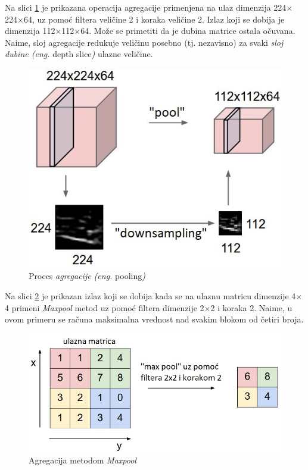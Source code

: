 \documentclass[a4paper]{article}
\begin{document}
Na slici \ref{fig:pool} je prikazana operacija agregacije primenjena na ulaz dimenzija 224$\times$224$\times$64, uz pomoć filtera veličine 2 i koraka veličine 2. Izlaz koji se dobija je dimenzija 112$\times$112$\times$64. Može se primetiti da je dubina matrice ostala očuvana. Naime, sloj agregacije redukuje veličinu posebno (tj. nezavisno) za svaki \textit{sloj dubine (eng.} depth slice\textit{)} ulazne veličine.

\begin{figure}[h!]
\begin{center}
\includegraphics[scale=0.4]{pool.jpeg}
\end{center}
\caption{Proces \textit{agregacije (eng.} pooling\textit{)}}
\label{fig:pool}
\end{figure}

Na slici \ref{fig:maxpool} je prikazan izlaz koji se dobija kada se na ulaznu matricu dimenzije 4$\times$4 primeni \textit{Maxpool} metod uz pomoć filtera dimenzije 2$\times$2 i koraka 2. Naime, u ovom primeru se računa maksimalna vrednost nad svakim blokom od četiri broja.
 
\begin{figure}[h!]
\begin{center}
\includegraphics[scale=0.4]{maxpool.jpeg}
\end{center}
\caption{Agregacija metodom \textit{Maxpool}}
\label{fig:maxpool}
\end{figure}
\end{document}
